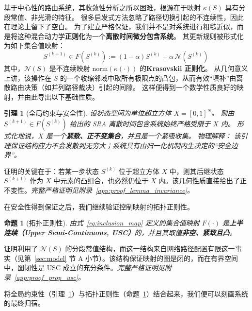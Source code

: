 \documentclass[journal]{IEEEtran}
\theoremstyle{plain}
\newtheorem{proposition}{命题}
\newtheorem{lemma}{引理}
\theoremstyle{definition}
\begin{document}
基于中心性的路由系统，其收敛性分析之所以困难，根源在于映射 $\kappa(S)$ 具有分段常值、非光滑的特征。
很多启发式方法忽略了路径切换引起的不连续性，因此在理论上留下了空白。
为了建立严格保证，我们并不是对系统进行粗糙近似，而是将这种混合动力学\textbf{正则化}为一个\textbf{离散时间微分包含系统}。
其更新规则被形式化为如下集合值映射：
\begin{equation}\label{eq:inclusion_map}
S^{(k+1)} \in F(S^{(k)}) := (1-\alpha)S^{(k)}+\alpha\,\mathcal{N}(S^{(k)})
\end{equation}
其中，$\mathcal{N}(S)$ 是不连续映射 $\mathrm{norm}(\kappa(\cdot))$ 的\textbf{Krasovskii 正则化}。
从几何意义上讲，该操作在 $S$ 的一个收缩邻域中取所有极限点的凸包，从而有效“填补”由离散路由决策（如并列路径裁决）引起的间隙。
这样便得到一个数学性质良好的映射，并由此导出以下基础性质。

\begin{lemma}[全局约束与安全性]
\label{lemma:invariance}
设状态空间为单位超立方体 $X=[0,1]^N$。
则由 $S^{(k+1)}\in F(S^{(k)})$ 给出的 SRA 离散时间包含系统始终严格受限于 $X$ 内。
形式化地说，$X$ 是一个\textbf{紧致、正不变集合}，并且是一个紧吸收集。
\textit{物理解释：} 该引理保证结构应力不会发散到无穷大；系统具有由归一化机制内生决定的“安全边界”。
\end{lemma}
\begin{IEEEproof}[证明思路]
证明的关键在于：若某一步状态 $S^{(k)}$ 位于超立方体 $X$ 中，则其后继状态 $S^{(k+1)}$ 作为 $X$ 中元素的凸组合，也必然仍位于 $X$ 内。该几何性质直接给出了正不变性。\textit{完整严格证明见附录~\ref{app:proof_lemma_invariance}。}
\end{IEEEproof}

在安全性得到保证之后，我们继续验证控制映射的拓扑正则性。

\begin{proposition}[拓扑正则性]
\label{prop:usc}
由式~\eqref{eq:inclusion_map} 定义的集合值映射 $F(\cdot)$ 是\textbf{上半连续（Upper Semi-Continuous, USC）}的，并且其取值\textbf{非空、紧致且凸}。
\end{proposition}
\begin{IEEEproof}[证明思路]
证明利用了 $\mathcal{N}(S)$ 的分段常值结构，而这一结构来自网络路径配置有限这一事实（见第~\ref{sec:model} 节 A 小节）。该结构保证映射的图是闭的，而在有界空间中，图闭性是 USC 成立的充分条件。\textit{完整严格证明见附录~\ref{app:proof_prop_usc}。}
\end{IEEEproof}

将全局约束性（引理~\ref{lemma:invariance}）与拓扑正则性（命题~\ref{prop:usc}）结合起来，我们便可以刻画系统的最终归宿。
\end{document}
